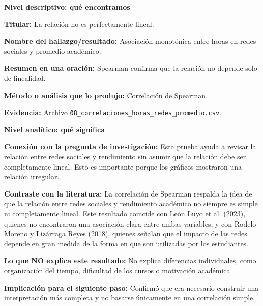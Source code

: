 \documentclass[12pt]{article}
\begin{document}
\begin{tcolorbox}[
colback=blue!5,
colframe=blue!75!black,
title=Ficha 5. Spearman: horas en redes vs promedio]

\textbf{Nivel descriptivo: qué encontramos}

\textbf{Titular:} La relación no es perfectamente lineal.

\textbf{Nombre del hallazgo/resultado:} Asociación monotónica entre horas en redes sociales y promedio académico.

\textbf{Resumen en una oración:} Spearman confirma que la relación no depende solo de linealidad.

\textbf{Método o análisis que lo produjo:} Correlación de Spearman.

\textbf{Evidencia:} Archivo \texttt{08\_correlaciones\_horas\_redes\_promedio.csv}.

\textbf{Nivel analítico: qué significa}

\textbf{Conexión con la pregunta de investigación:} Esta prueba ayuda a revisar la relación entre redes sociales y rendimiento sin asumir que la relación debe ser completamente lineal. Esto es importante porque los gráficos mostraron una relación irregular.

\textbf{Contraste con la literatura:} La correlación de Spearman respalda la idea de que la relación entre redes sociales y rendimiento académico no siempre es simple ni completamente lineal. Este resultado coincide con León Luyo et al. (2023), quienes no encontraron una asociación clara entre ambas variables, y con Rodelo Moreno y Lizárraga Reyes (2018), quienes señalan que el impacto de las redes depende en gran medida de la forma en que son utilizadas por los estudiantes.

\textbf{Lo que NO explica este resultado:} No explica diferencias individuales, como organización del tiempo, dificultad de los cursos o motivación académica.

\textbf{Implicación para el siguiente paso:} Confirmó que era necesario construir una interpretación más completa y no basarse únicamente en una correlación simple.
\end{tcolorbox}
\end{document}
